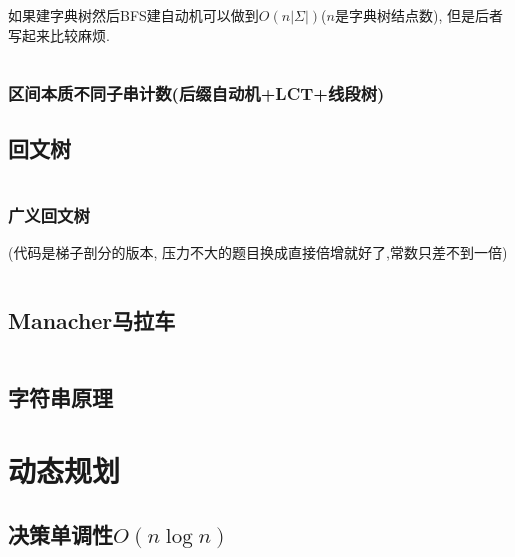 \documentclass[a4paper, twoside]{article}
\begin{document}
\begin{multicols}{2}
				如果建字典树然后BFS建自动机可以做到$O\left(n\left|\Sigma\right|\right)$($n$是字典树结点数), 但是后者写起来比较麻烦.
				\inputminted{cpp}{../src/string/广义后缀自动机.cpp}

				\subsubsection[区间本质不同子串计数]{区间本质不同子串计数(后缀自动机+LCT+线段树)}
					

			\subsection{回文树}
				\inputminted{cpp}{../src/string/回文树.cpp}

				\subsubsection{广义回文树}
					(代码是梯子剖分的版本, 压力不大的题目换成直接倍增就好了,常数只差不到一倍)
					\inputminted{cpp}{../src/string/广义回文树.cpp}



			\subsection{Manacher马拉车}
				\inputminted{cpp}{../src/string/manacher.cpp}
			


			\subsection{字符串原理}
				

		\newpage
		\section{动态规划}
			\subsection{决策单调性$O(n\log n)$}
				\inputminted{cpp}{../src/dp/决策单调性.cpp}
			

\end{multicols}
\end{document}

